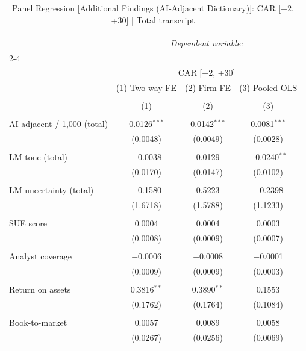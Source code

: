 
\begin{table}[!htbp] \centering 
  \caption{Panel Regression [Additional Findings (AI-Adjacent Dictionary)]: CAR [+2, +30]  |  Total transcript} 
  \label{} 
\begin{tabular}{@{\extracolsep{5pt}}lccc} 
\\[-1.8ex]\hline 
\hline \\[-1.8ex] 
 & \multicolumn{3}{c}{\textit{Dependent variable:}} \\ 
\cline{2-4} 
\\[-1.8ex] & \multicolumn{3}{c}{CAR [+2, +30]} \\ 
 & (1) Two-way FE & (2) Firm FE & (3) Pooled OLS \\ 
\\[-1.8ex] & (1) & (2) & (3)\\ 
\hline \\[-1.8ex] 
 AI adjacent / 1,000 (total) & 0.0126$^{***}$ & 0.0142$^{***}$ & 0.0081$^{***}$ \\ 
  & (0.0048) & (0.0049) & (0.0028) \\ 
  & & & \\ 
 LM tone (total) & $-$0.0038 & 0.0129 & $-$0.0240$^{**}$ \\ 
  & (0.0170) & (0.0147) & (0.0102) \\ 
  & & & \\ 
 LM uncertainty (total) & $-$0.1580 & 0.5223 & $-$0.2398 \\ 
  & (1.6718) & (1.5788) & (1.1233) \\ 
  & & & \\ 
 SUE score & 0.0004 & 0.0004 & 0.0003 \\ 
  & (0.0008) & (0.0009) & (0.0007) \\ 
  & & & \\ 
 Analyst coverage & $-$0.0006 & $-$0.0008 & $-$0.0001 \\ 
  & (0.0009) & (0.0009) & (0.0003) \\ 
  & & & \\ 
 Return on assets & 0.3816$^{**}$ & 0.3890$^{**}$ & 0.1553 \\ 
  & (0.1762) & (0.1764) & (0.1084) \\ 
  & & & \\ 
 Book-to-market & 0.0057 & 0.0089 & 0.0058 \\ 
  & (0.0267) & (0.0256) & (0.0069) \\ 

\end{tabular}
\end{table}
